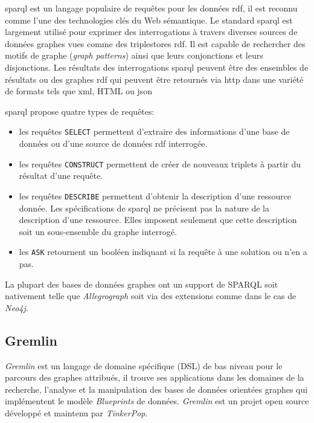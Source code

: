   \acrshort{sparql} \cite{prud2008sparql} est un langage populaire de
  requêtes pour les données \acrshort{rdf}, il est reconnu comme l'une
  des technologies clés du Web sémantique. Le standard
  \acrshort{sparql} est largement utilisé pour exprimer des
  interrogations à travers diverses sources de données graphes vues
  comme des triplestores \acrshort{rdf}. Il est capable de rechercher
  des motifs de graphe (\emph{graph patterns}) ainsi que leurs
  conjonctions et leurs disjonctions. Les résultats des interrogations
  \acrshort{sparql} peuvent être des ensembles de résultats ou des
  graphes \acrshort{rdf} qui peuvent être retournés via
  \acrshort{http} dans une variété de formats tels que \acrshort{xml},
  HTML ou \acrshort{json}\medskip

  \acrshort{sparql} propose quatre types de requêtes:\medskip

  \begin{itemize}\renewcommand\labelitemi{--}
  \item les requêtes \texttt{SELECT} permettent d'extraire des
    informations d'une base de données ou d'une source de données
    \acrshort{rdf} interrogée.
  \item les requêtes \texttt{CONSTRUCT} permettent de créer de
    nouveaux triplets à partir du résultat d'une requête.

  \item les requêtes \texttt{DESCRIBE} permettent d'obtenir la
    description d'une ressource donnée. Les spécifications de
    \acrshort{sparql} ne précisent pas la nature de la description
    d'une ressource. Elles imposent seulement que cette description
    soit un sous-ensemble du graphe interrogé.

  \item les \texttt{ASK} retournent un booléen indiquant si la requête
    à une solution ou n'en a pas.
  \end{itemize}
  \enddescription
  \medskip

  La plupart des bases de données graphes ont un support de
  \textsc{SPARQL} soit nativement telle que \emph{Allegrograph} soit
  via des extensions comme dans le cas de \emph{Neo4j}.
  \newpage

  \subsection{Gremlin}
  \label{sec:gremlin}
  \emph{Gremlin} \cite{gremlin-wiki} est un langage de domaine
  spécifique (\acrshort{DSL}) de bas niveau pour le parcours des
  graphes attribués, il trouve ses applications dans les domaines de
  la recherche, l'analyse et la manipulation des bases de données
  orientées graphes qui implémentent le modèle \emph{Blueprints}
  \cite{blueprints} de données. \emph{Gremlin} \cite{gremlin-wiki} est
  un projet open source développé et maintenu par
  \emph{TinkerPop}.\medskip


